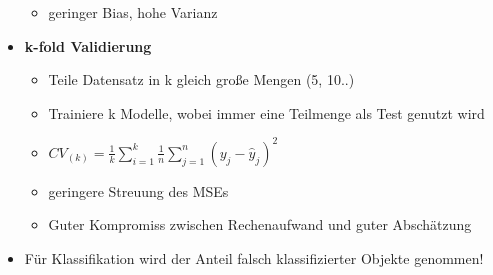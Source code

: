 \documentclass[a4paper]{article}
\begin{document}
\begin{landscape}
\begin{multicols}{3}
\begin{itemize}[noitemsep,nolistsep,leftmargin=*]
\begin{itemize}[noitemsep,nolistsep,leftmargin=*]
                \item geringer Bias, hohe Varianz
            \end{itemize}
            \item \textbf{k-fold Validierung}
            \begin{itemize}[noitemsep,nolistsep,leftmargin=*]
                \item Teile Datensatz in k gleich große Mengen (5, 10..)
                \item Trainiere k Modelle, wobei immer eine Teilmenge als Test genutzt wird
                \item $CV_{(k)} = \frac{1}{k}\sum_{i=1}^k \frac{1}{n}\sum_{j=1}^{n}(y_j - \hat{y}_j)^2$
                \item geringere Streuung des MSEs
                \item Guter Kompromiss zwischen Rechenaufwand und guter Abschätzung
            \end{itemize}
            \item Für Klassifikation wird der Anteil falsch klassifizierter Objekte genommen!
        \end{itemize}




\end{multicols}
\end{landscape}
\end{document}
